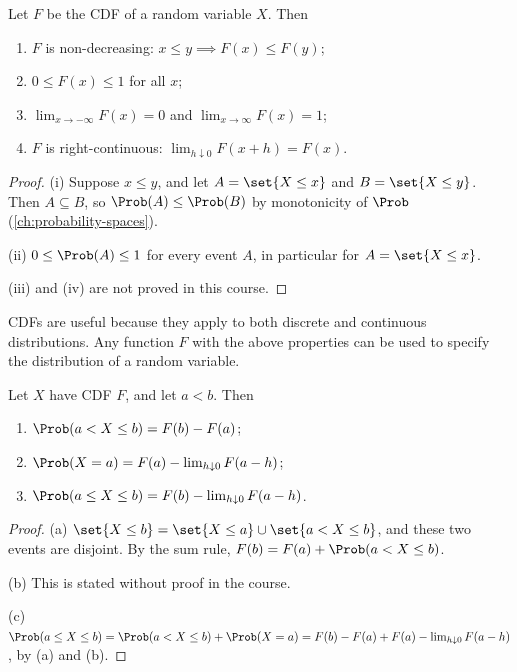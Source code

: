 \begin{theorem}\label{thm:cdf-properties}
Let $F$ be the CDF of a random variable $X$. Then
\begin{enumerate}[label=(\roman*)]
  \item $F$ is non-decreasing: $x \le y \implies F(x) \le F(y)$;
  \item $0 \le F(x) \le 1$ for all $x$;
  \item $\lim_{x \to -\infty} F(x) = 0$ and $\lim_{x \to \infty} F(x) = 1$;
  \item $F$ is right-continuous: $\lim_{h \downarrow 0} F(x + h) = F(x)$.
\end{enumerate}
\end{theorem}

\begin{proof}
(i) Suppose $x \le y$, and let $A = \set{X \le x}$ and $B = \set{X \le y}$. Then $A \subseteq B$, so $\Prob(A) \le \Prob(B)$ by monotonicity of $\Prob$ (\cref{ch:probability-spaces}).

(ii) $0 \le \Prob(A) \le 1$ for every event $A$, in particular for $A = \set{X \le x}$.

(iii) and (iv) are not proved in this course.
\end{proof}

CDFs are useful because they apply to both discrete and continuous distributions. Any function $F$ with the above properties can be used to specify the distribution of a random variable.

\begin{proposition}\label{prop:cdf-interval-probabilities}
Let $X$ have CDF $F$, and let $a < b$. Then
\begin{enumerate}[label=(\alph*)]
  \item $\Prob(a < X \le b) = F(b) - F(a)$;
  \item $\Prob(X = a) = F(a) - \lim_{h \downarrow 0} F(a - h)$;
  \item $\Prob(a \le X \le b) = F(b) - \lim_{h \downarrow 0} F(a - h)$.
\end{enumerate}
\end{proposition}

\begin{proof}
(a) $\set{X \le b} = \set{X \le a} \cup \set{a < X \le b}$, and these two events are disjoint. By the sum rule, $F(b) = F(a) + \Prob(a < X \le b)$.

(b) This is stated without proof in the course.

(c) $\Prob(a \le X \le b) = \Prob(a < X \le b) + \Prob(X = a) = F(b) - F(a) + F(a) - \lim_{h \downarrow 0} F(a - h)$, by (a) and (b).
\end{proof}

